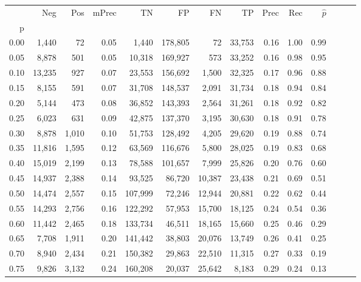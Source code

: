 \begin{tabular}{rrrrrrrrrrrrrr}
\toprule
{} &     Neg &    Pos & mPrec &       TN &       FP &      FN &      TP &  Prec &   Rec & $\hat{p}$ \\
p    &         &        &       &          &          &         &         &       &       &           \\
\midrule
0.00 &   1,440 &     72 &  0.05 &    1,440 &  178,805 &      72 &  33,753 &  0.16 &  1.00 &      0.99 \\
0.05 &   8,878 &    501 &  0.05 &   10,318 &  169,927 &     573 &  33,252 &  0.16 &  0.98 &      0.95 \\
0.10 &  13,235 &    927 &  0.07 &   23,553 &  156,692 &   1,500 &  32,325 &  0.17 &  0.96 &      0.88 \\
0.15 &   8,155 &    591 &  0.07 &   31,708 &  148,537 &   2,091 &  31,734 &  0.18 &  0.94 &      0.84 \\
0.20 &   5,144 &    473 &  0.08 &   36,852 &  143,393 &   2,564 &  31,261 &  0.18 &  0.92 &      0.82 \\
0.25 &   6,023 &    631 &  0.09 &   42,875 &  137,370 &   3,195 &  30,630 &  0.18 &  0.91 &      0.78 \\
0.30 &   8,878 &  1,010 &  0.10 &   51,753 &  128,492 &   4,205 &  29,620 &  0.19 &  0.88 &      0.74 \\
0.35 &  11,816 &  1,595 &  0.12 &   63,569 &  116,676 &   5,800 &  28,025 &  0.19 &  0.83 &      0.68 \\
0.40 &  15,019 &  2,199 &  0.13 &   78,588 &  101,657 &   7,999 &  25,826 &  0.20 &  0.76 &      0.60 \\
0.45 &  14,937 &  2,388 &  0.14 &   93,525 &   86,720 &  10,387 &  23,438 &  0.21 &  0.69 &      0.51 \\
0.50 &  14,474 &  2,557 &  0.15 &  107,999 &   72,246 &  12,944 &  20,881 &  0.22 &  0.62 &      0.44 \\
0.55 &  14,293 &  2,756 &  0.16 &  122,292 &   57,953 &  15,700 &  18,125 &  0.24 &  0.54 &      0.36 \\
0.60 &  11,442 &  2,465 &  0.18 &  133,734 &   46,511 &  18,165 &  15,660 &  0.25 &  0.46 &      0.29 \\
0.65 &   7,708 &  1,911 &  0.20 &  141,442 &   38,803 &  20,076 &  13,749 &  0.26 &  0.41 &      0.25 \\
0.70 &   8,940 &  2,434 &  0.21 &  150,382 &   29,863 &  22,510 &  11,315 &  0.27 &  0.33 &      0.19 \\
0.75 &   9,826 &  3,132 &  0.24 &  160,208 &   20,037 &  25,642 &   8,183 &  0.29 &  0.24 &      0.13 \\

\end{tabular}
